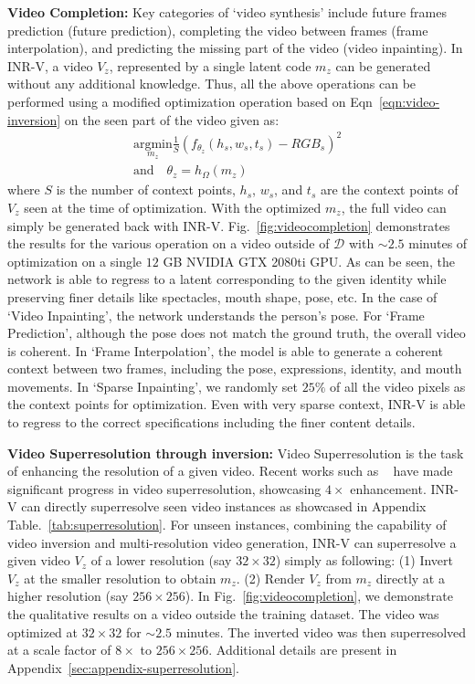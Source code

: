 \documentclass[10pt]{article} \usepackage[accepted]{tmlr}
\begin{document}
\textbf{Video Completion:} Key categories of `video synthesis' include future frames prediction (future prediction), completing the video between frames (frame interpolation), and predicting the missing part of the video (video inpainting). In INR-V, a video $V_z$, represented by a single latent code $m_z$ can be generated without any additional knowledge. Thus, all the above operations can be performed using a modified optimization operation based on Eqn~\ref{eqn:video-inversion} on the seen part of the video given as:
\begin{equation}
    \begin{gathered}
        \underset{m_z}{\mathrm{argmin}} \frac{1}{S} (f_{\theta_z}(h_s, w_s, t_s) - {RGB}_s)^2\\  \textrm{and} \quad \theta_z = h_\Omega(m_z)
    \end{gathered}
    \label{eqn:half-inversion}
\end{equation}
where $S$ is the number of context points, $h_s$, $w_s$, and $t_s$ are the context points of $V_z$ seen at the time of optimization. 
With the optimized $m_z$, the full video can simply be generated back with INR-V. Fig.~\ref{fig:videocompletion} demonstrates the results for the various operation on a video outside of $\mathcal{D}$ with $\sim2.5$ minutes of optimization on a single $12$ GB NVIDIA GTX 2080ti GPU. As can be seen, the network is able to regress to a latent corresponding to the given identity while preserving finer details like spectacles, mouth shape, pose, etc. In the case of `Video Inpainting', the network understands the person's pose.
For `Frame Prediction', although the pose does not match the ground truth, the overall video is coherent. In `Frame Interpolation', the model is able to generate a coherent context between two frames, including the pose, expressions, identity, and mouth movements. In `Sparse Inpainting', 
we randomly set $25\%$ of all the video pixels as the context points for optimization. Even with very sparse context, INR-V is able to regress to the correct specifications including the finer content details.


\textbf{Video Superresolution through inversion:} Video Superresolution is the task of enhancing the resolution of a given video.
Recent works such as ~\cite{tecogan, vrt, framerecvideosr, iseebetter, edvr, videoinr} have made significant progress in video superresolution, showcasing $4\times$ enhancement. INR-V can directly superresolve seen video instances as showcased in Appendix Table.~\ref{tab:superresolution}. For unseen instances, combining the capability of video inversion and multi-resolution video generation, INR-V can superresolve a given video $V_z$ of a lower resolution (say $32 \times 32$) simply as following: (1) Invert $V_z$ at the smaller resolution to obtain $m_z$. (2) Render $V_z$ from $m_z$ directly at a higher resolution (say $256 \times 256$). In Fig.~\ref{fig:videocompletion}, we demonstrate the qualitative results on a video outside the training dataset. The video was optimized at $32 \times 32$ for $\sim2.5$ minutes.
The inverted video was then superresolved at a scale factor of $8\times$ to $256 \times 256$. Additional details are present in Appendix~\ref{sec:appendix-superresolution}.
\end{document}
